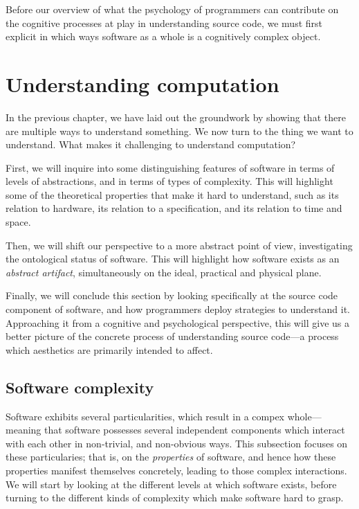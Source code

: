 Before our overview of what the psychology of programmers can contribute on the cognitive processes at play in understanding source code, we must first explicit in which ways software as a whole is a cognitively complex object.

\spacer

\section{Understanding computation}
\label{sec:understanding-computation}

In the previous chapter, we have laid out the groundwork by showing that there are multiple ways to understand something. We now turn to the thing we want to understand. What makes it challenging to understand computation?

First, we will inquire into some distinguishing features of software in terms of levels of abstractions, and in terms of types of complexity. This will highlight some of the theoretical properties that make it hard to understand, such as its relation to hardware, its relation to a specification, and its relation to time and space.

Then, we will shift our perspective to a more abstract point of view, investigating the ontological status of software. This will highlight how software exists as an \emph{abstract artifact}, simultaneously on the ideal, practical and physical plane.

Finally, we will conclude this section by looking specifically at the source code component of software, and how programmers deploy strategies to understand it. Approaching it from a cognitive and psychological perspective, this will give us a better picture of the concrete process of understanding source code—a process which aesthetics are primarily intended to affect.

\subsection{Software complexity}
\label{subsec:software-complexity}

Software exhibits several particularities, which result in a compex whole—meaning that software possesses several independent components which interact with each other in non-trivial, and non-obvious ways. This subsection focuses on these particularies; that is, on the \emph{properties} of software, and hence how these properties manifest themselves concretely, leading to those complex interactions. We will start by looking at the different levels at which software exists, before turning to the different kinds of complexity which make software hard to grasp.

